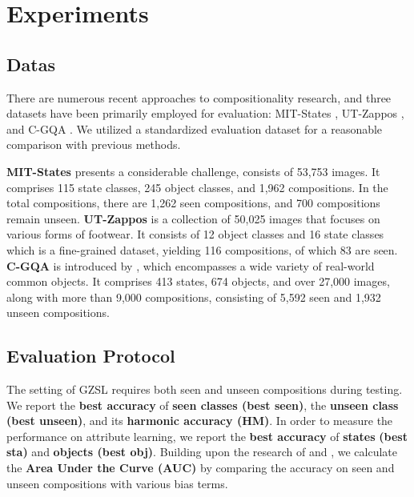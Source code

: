 \documentclass[letterpaper]{article} %
\theoremstyle{definition}
\begin{document}
\section{Experiments} \label{sec.experiments}
\subsection{Datas\label{subsec.datasets}}
There are numerous recent approaches to compositionality research, and three datasets have been primarily employed for evaluation: MIT-States \cite{mit}, UT-Zappos \cite{utzappos}, and C-GQA \cite{naeem2021learning}. We utilized a standardized evaluation dataset for a reasonable comparison with previous methods.

\textbf{MIT-States} presents a considerable challenge, consists of 53,753 images. It comprises 115 state classes, 245 object classes, and 1,962 compositions. In the total compositions, there are 1,262 seen compositions, and 700 compositions remain unseen. \textbf{UT-Zappos} is a collection of 50,025 images that focuses on various forms of footwear. It consists of 12 object classes and 16 state classes which is a fine-grained dataset, yielding 116 compositions, of which 83 are seen. \textbf{C-GQA} is introduced by \citet{naeem2021learning}, which encompasses a wide variety of real-world common objects. It comprises 413 states, 674 objects, and over 27,000 images, along with more than 9,000 compositions, consisting of 5,592 seen and 1,932 unseen compositions.

\subsection{Evaluation Protocol} \label{subsec.metrics}
The setting of GZSL \cite{xian2017zero} requires both seen and unseen compositions during testing. We report the \textbf{best accuracy} of \textbf{seen classes (best seen)}, the \textbf{unseen class (best unseen)}, and its \textbf{harmonic accuracy (HM)}. In order to measure the performance on attribute learning, we report the \textbf{best accuracy} of \textbf{states} \textbf{(best sta)} and \textbf{objects (best obj)}. Building upon the research of \cite{naeem2021learning} and \cite{wang2019task}, we calculate the \textbf{Area Under the Curve (AUC)} by comparing the accuracy on seen and unseen compositions with various bias terms.
\end{document}

